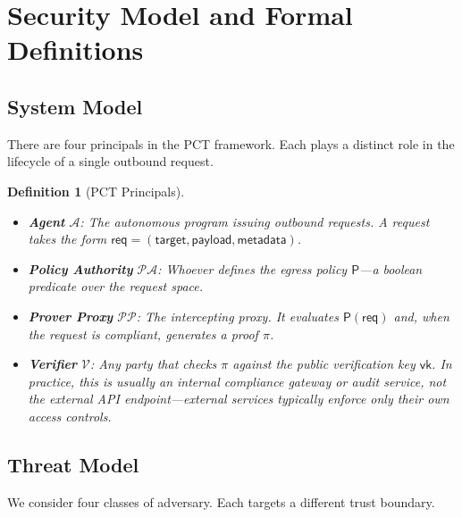\documentclass[10pt,conference]{IEEEtran}
\newtheorem{definition}{Definition}
\begin{document}
\section{Security Model and Formal Definitions}
\label{sec:model}

\subsection{System Model}

There are four principals in the PCT framework. Each plays a distinct role in the lifecycle of a single outbound request.

\begin{definition}[PCT Principals]
\label{def:principals}
\begin{itemize}
    \item \textbf{Agent} $\mathcal{A}$: The autonomous program issuing outbound requests. A request takes the form $\mathsf{req} = (\mathsf{target}, \mathsf{payload}, \mathsf{metadata})$.
    \item \textbf{Policy Authority} $\mathcal{PA}$: Whoever defines the egress policy $\mathsf{P}$---a boolean predicate over the request space.
    \item \textbf{Prover Proxy} $\mathcal{PP}$: The intercepting proxy. It evaluates $\mathsf{P}(\mathsf{req})$ and, when the request is compliant, generates a proof $\pi$.
    \item \textbf{Verifier} $\mathcal{V}$: Any party that checks $\pi$ against the public verification key $\mathsf{vk}$. In practice, this is usually an internal compliance gateway or audit service, not the external API endpoint---external services typically enforce only their own access controls.
\end{itemize}
\end{definition}

\subsection{Threat Model}

We consider four classes of adversary. Each targets a different trust boundary.
\end{document}
